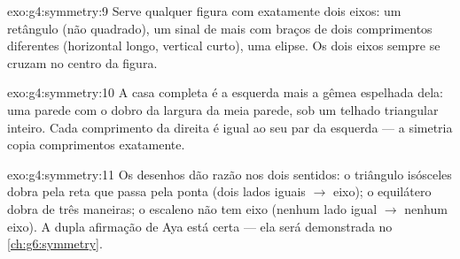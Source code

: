 \begin{solution}{exo:g4:symmetry:9}
Serve qualquer figura com exatamente dois eixos: um retângulo (não
quadrado), um sinal de mais com braços de dois comprimentos
diferentes (horizontal longo, vertical curto), uma elipse. Os dois
eixos sempre se cruzam no centro da figura.
\end{solution}

\begin{solution}{exo:g4:symmetry:10}
A casa completa é a  esquerda mais a gêmea espelhada dela: uma
parede com o dobro da largura da meia parede, sob um telhado
triangular inteiro. Cada comprimento da direita é igual ao seu par da
esquerda --- a simetria copia comprimentos exatamente.
\end{solution}

\begin{solution}{exo:g4:symmetry:11}
Os desenhos dão razão nos dois sentidos: o triângulo isósceles dobra
pela reta que passa pela ponta (dois lados iguais $\to$ eixo); o
equilátero dobra de três maneiras; o escaleno não tem eixo (nenhum
lado igual $\to$ nenhum eixo). A dupla afirmação de Aya está certa
--- ela será demonstrada no \cref{ch:g6:symmetry}.
\end{solution}
